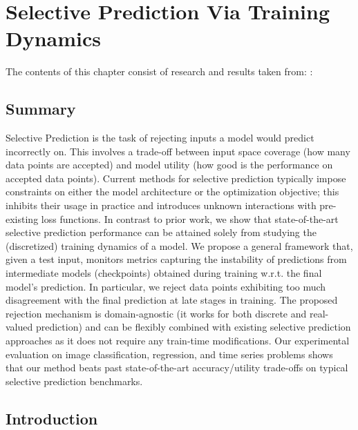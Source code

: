 \newcommand{\shortened}[1]{\color{black} #1\xspace\color{black}}
\newcommand{\newlyadded}[1]{\color{black} #1\xspace\color{black}}
\newcommand{\fixed}[1]{\color{black} #1\xspace\color{black}}


\chapter{Selective Prediction Via Training Dynamics}
\label{ch:sptd}

\begin{paperref}
\normalfont
The contents of this chapter consist of research and results taken from: \citet{rabanser2022selective}: \emph{}
\end{paperref}

\section*{Summary}

Selective Prediction is the task of rejecting inputs a model would predict incorrectly on. This involves a trade-off between input space coverage (how many data points are accepted) and model utility (how good is the performance on accepted data points). Current methods for selective prediction typically impose constraints on either the model architecture or the optimization objective; this inhibits their usage in practice and introduces unknown interactions with pre-existing loss functions. In contrast to prior work, we show that state-of-the-art selective prediction performance can be attained solely from studying the (discretized) training dynamics of a model. We propose a general framework that, given a test input, monitors metrics capturing the instability of predictions from intermediate models (\ie checkpoints) obtained during training w.r.t. the final model's prediction. In particular, we reject data points exhibiting too much disagreement with the final prediction at late stages in training. The proposed rejection mechanism is domain-agnostic (\ie it works for both discrete and real-valued prediction) and can be flexibly combined with existing selective prediction approaches as it does not require any train-time modifications. Our experimental evaluation on image classification, regression, and time series problems shows that our method beats past state-of-the-art accuracy/utility trade-offs on typical selective prediction benchmarks.


\section{Introduction}

